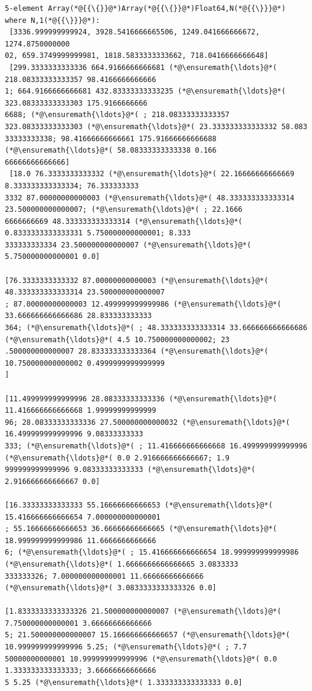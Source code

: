 \documentclass[12pt,a4paper]{article}
\begin{document}
\begin{lstlisting}
5-element Array(*@{{\{}}@*)Array(*@{{\{}}@*)Float64,N(*@{{\}}}@*) where N,1(*@{{\}}}@*):
 [3336.999999999924, 3928.5416666665506, 1249.041666666672, 1274.8750000000
02, 659.3749999999981, 1818.5833333333662, 718.0416666666648]
 [299.3333333333336 664.9166666666681 (*@\ensuremath{\ldots}@*( 218.08333333333357 98.4166666666666
1; 664.9166666666681 432.83333333333235 (*@\ensuremath{\ldots}@*( 323.08333333333303 175.9166666666
6688; (*@\ensuremath{\ldots}@*( ; 218.08333333333357 323.08333333333303 (*@\ensuremath{\ldots}@*( 23.333333333333332 58.083
33333333338; 98.41666666666661 175.91666666666688 (*@\ensuremath{\ldots}@*( 58.08333333333338 0.166
66666666666666]
 [18.0 76.3333333333332 (*@\ensuremath{\ldots}@*( 22.16666666666669 8.333333333333334; 76.333333333
3332 87.00000000000003 (*@\ensuremath{\ldots}@*( 48.333333333333314 23.500000000000007; (*@\ensuremath{\ldots}@*( ; 22.1666
6666666669 48.333333333333314 (*@\ensuremath{\ldots}@*( 0.8333333333333331 5.750000000000001; 8.333
333333333334 23.500000000000007 (*@\ensuremath{\ldots}@*( 5.750000000000001 0.0]

[76.3333333333332 87.00000000000003 (*@\ensuremath{\ldots}@*( 48.333333333333314 23.500000000000007
; 87.00000000000003 12.499999999999986 (*@\ensuremath{\ldots}@*( 33.666666666666686 28.833333333333
364; (*@\ensuremath{\ldots}@*( ; 48.333333333333314 33.666666666666686 (*@\ensuremath{\ldots}@*( 4.5 10.750000000000002; 23
.500000000000007 28.833333333333364 (*@\ensuremath{\ldots}@*( 10.750000000000002 0.4999999999999999
]

[11.499999999999996 28.08333333333336 (*@\ensuremath{\ldots}@*( 11.416666666666668 1.99999999999999
96; 28.08333333333336 27.500000000000032 (*@\ensuremath{\ldots}@*( 16.499999999999996 9.08333333333
333; (*@\ensuremath{\ldots}@*( ; 11.416666666666668 16.499999999999996 (*@\ensuremath{\ldots}@*( 0.0 2.916666666666667; 1.9
999999999999996 9.08333333333333 (*@\ensuremath{\ldots}@*( 2.916666666666667 0.0]

[16.33333333333333 55.16666666666653 (*@\ensuremath{\ldots}@*( 15.416666666666654 7.000000000000001
; 55.16666666666653 36.66666666666665 (*@\ensuremath{\ldots}@*( 18.999999999999986 11.6666666666666
6; (*@\ensuremath{\ldots}@*( ; 15.416666666666654 18.999999999999986 (*@\ensuremath{\ldots}@*( 1.6666666666666665 3.0833333
333333326; 7.000000000000001 11.66666666666666 (*@\ensuremath{\ldots}@*( 3.0833333333333326 0.0]

[1.8333333333333326 21.500000000000007 (*@\ensuremath{\ldots}@*( 7.750000000000001 3.66666666666666
5; 21.500000000000007 15.166666666666657 (*@\ensuremath{\ldots}@*( 10.999999999999996 5.25; (*@\ensuremath{\ldots}@*( ; 7.7
50000000000001 10.999999999999996 (*@\ensuremath{\ldots}@*( 0.0 1.333333333333333; 3.66666666666666
5 5.25 (*@\ensuremath{\ldots}@*( 1.333333333333333 0.0]


\end{lstlisting}
\end{document}
